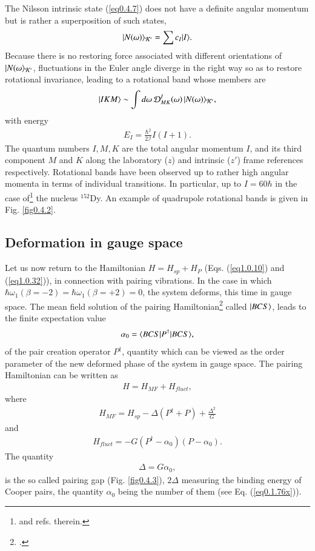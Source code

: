 The Nilsson intrinsic state (\ref{eq0.4.7}) does not have a definite angular momentum but is rather a superposition of such states,
\begin{align}\label{eq0.4.11}
|{N(\omega)} \rangle_{\mathcal K'}=\sum c_I|{I} \rangle.
\end{align}
Because there is no restoring force associated with different orientations of $|{N(\omega} \rangle_{\mathcal K'}$, fluctuations in the Euler angle diverge in the right way so as to restore rotational invariance, leading to a rotational band whose members are 
\begin{align}\label{eq0.1.47}
|{IKM} \rangle\sim\int d\omega \,\mathcal D^I_{MK}(\omega)\,|{N(\omega)} \rangle_{\mathcal K'},
\end{align}
with energy
\begin{align}\label{eq0.1.48}
E_I=\frac{\hbar^2}{2\mathcal I}I(I+1).
\end{align}
The quantum numbers $I,M,K$ are the total angular momentum $I$, and its third component $M$ and $K$ along the laboratory ($z$) and intrinsic ($z'$) frame references respectively.
Rotational bands have been observed up to rather high angular momenta in terms of individual transitions. In particular, up to $I=60\hbar$ in the case of\footnote{\cite{Nolan:88} and refs. therein.} the nucleus $^{152}$Dy. An example of quadrupole rotational bands  is given in Fig. \ref{fig0.4.2}. 
\subsection{Deformation in gauge space}\label{S1.4.2}
Let us now return to the Hamiltonian $H=H_{sp}+H_{P}$  (Eqs. (\ref{eq1.0.10}) and (\ref{eq1.0.32})), in connection with pairing vibrations. In the case in which \mbox{$\hbar\omega_1(\beta=-2)=\hbar\omega_1(\beta=+2)=0$}, the system deforms, this time in gauge space. The  mean field solution of the pairing Hamiltonian\footnote{\cite{Bardeen:57a,Bardeen:57b}.} called $|{BCS} \rangle$,  leads to the finite expectation value
\begin{align}\label{eq0.4.14}
\alpha_0=\langle {BCS|P^\dagger|BCS} \rangle,
 \end{align}
   of the pair creation operator $P^\dagger$, quantity which can be viewed as the order parameter of the new deformed  phase of the system in gauge space. The pairing Hamiltonian can be written as
\begin{align}\label{eq0.1.50}
H=H_{MF}+H_{fluct},
\end{align}
where 
\begin{align}\label{eq0.1.51}
H_{MF}=H_{sp}-\Delta(P^\dagger+P)+\frac{\Delta^2}{G}
\end{align}
and
\begin{align}\label{eq0.1.52}
H_{fluct}=-G(P^\dagger-\alpha_0)(P-\alpha_0).
\end{align}
The quantity 
\begin{align}\label{eq0.1.53}
\Delta=G\alpha_0,
\end{align}
is the so called pairing gap (Fig. \ref{fig0.4.3}), $2\Delta$ measuring the binding energy of Cooper pairs, the quantity $\alpha_0$ being the number of them (see Eq. (\ref{eq0.1.76x})).

